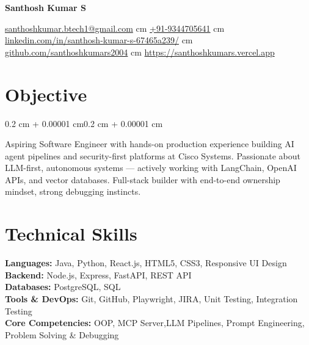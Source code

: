 \documentclass[10pt, letterpaper]{article}
\newenvironment{onecolentry}{
    \begin{adjustwidth}{0.2 cm + 0.00001 cm}{0.2 cm + 0.00001 cm}
}{
    \end{adjustwidth}
}
\newenvironment{header}{
    \setlength{\topsep}{0pt}\par\kern\topsep\centering\linespread{1.2}
}{
    \par\kern\topsep
}
\begin{document}
\begin{header}
    \textbf{\fontsize{24 pt}{24 pt}\selectfont Santhosh Kumar S}

    \vspace{0.1cm}

    \normalsize
    \mbox{{\color{black}\footnotesize\faEnvelope[regular]}\hspace{0.13cm}\href{mailto:santhoshkumar.btech1@gmail.com}{santhoshkumar.btech1@gmail.com}}  cm
    \mbox{{\color{black}\footnotesize\faPhone*}\hspace{0.13cm}\href{tel:+919344705641}{+91-9344705641}}  cm
    \mbox{{\color{black}\footnotesize\faLinkedinIn}\hspace{0.13cm}\href{https://www.linkedin.com/in/santhosh-kumar-s-67465a239/}{linkedin.com/in/santhosh-kumar-s-67465a239/}}  cm
    \mbox{{\color{black}\footnotesize\faGithub}\hspace{0.13cm}\href{https://github.com/santhoshkumars2004}{github.com/santhoshkumars2004}}  cm
    \mbox{{\color{black}\footnotesize\faGlobe}\hspace{0.13cm}\href{https://santhoshkumars.vercel.app/}{https://santhoshkumars.vercel.app}}
\end{header}
\vspace{-0.3cm}

\section{Objective}

\begin{onecolentry}
Aspiring Software Engineer with hands-on production experience building AI agent pipelines and security-first platforms at Cisco Systems. Passionate about LLM-first, autonomous systems — actively working with LangChain, OpenAI APIs, and vector databases. Full-stack builder with end-to-end ownership mindset, strong debugging instincts.
\end{onecolentry}

\section{Technical Skills}
\textbf{Languages:} Java, Python, React.js, HTML5, CSS3, Responsive UI Design \\
\textbf{Backend:} Node.js, Express, FastAPI, REST API \\
\textbf{Databases:} PostgreSQL, SQL \\
\textbf{Tools \& DevOps:} Git, GitHub, Playwright, JIRA, Unit Testing, Integration Testing \\
\textbf{Core Competencies:} OOP, MCP Server,LLM Pipelines, Prompt Engineering, Problem Solving \& Debugging
\end{document}

